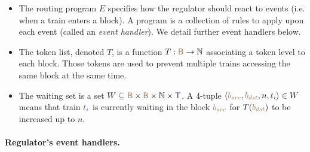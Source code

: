 \documentclass[runningheads]{llncs}
\newcommand{\Nat}{{\mbox{$\mathbb{N}$}}}
\newcommand{\tuple}[1]{\ensuremath{\langle #1\rangle}}
\newcommand{\posFmt}[1]{{\color{poscolor}{#1}}}
\newcommand{\blocks}{{\posFmt{\mathsf{B}}}}
\newcommand{\bid}[1]{\ensuremath{\posFmt{b_{#1}}}}
\newcommand{\trainFmt}[1]{{\color{traincolor} #1}}
\newcommand{\trains}{{\trainFmt{\mathsf{T}}}}
\newcommand{\tid}[1]{\ensuremath{\trainFmt{t_{#1}}}}
\newcommand{\tokens}{\ensuremath{T}}
\newcommand{\tokenOf}[1]{\ensuremath{T(\posFmt{#1})}}
\newcommand{\incrToken}[2]{\ensuremath{#1. {\tt incr}(\posFmt{#2})}}
\begin{document}
\begin{itemize}
	\item The routing program $E$ specifies how the regulator should react to events (i.e. when a train enters a block). A program is a collection of rules to apply upon each event (called an \emph{event handler}). We detail further event handlers below.
	\item The token list, denoted $\tokens$, is a function  $\tokens: \blocks \to \Nat$ associating a token level to each block. Those tokens are used to prevent multiple trains accessing the same block at the same time.
	\item The waiting set is a set $W \subseteq \blocks \times \blocks \times \Nat \times \trains$. A 4-tuple $\tuple{\bid{src}, \bid{dst}, n, \tid{i}} \in W$ means that train \tid{i} is currently waiting in the block \bid{src} for $\tokenOf{\bid{dst}}$ to be increased up to $n$.
\end{itemize}


\paragraph{Regulator's event handlers.}
\end{document}

